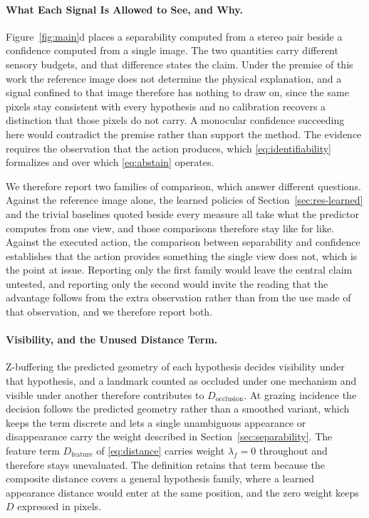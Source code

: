 \documentclass{article} %
\theoremstyle{defstyle}
\theoremstyle{plain}
\begin{document}
\paragraph{What Each Signal Is Allowed to See, and Why.}
Figure~\ref{fig:main}d places a separability computed from a stereo pair beside a confidence
computed from a single image. The two quantities carry different sensory budgets, and that
difference states the claim. Under the premise of this work the reference image does not
determine the physical explanation, and a signal confined to that image therefore has nothing
to draw on, since the same pixels stay consistent with every hypothesis and no calibration
recovers a distinction that those pixels do not carry. A monocular confidence succeeding here
would contradict the premise rather than support the method. The evidence requires the
observation that the action produces, which \eqref{eq:identifiability} formalizes and over
which \eqref{eq:abstain} operates.

We therefore report two families of comparison, which answer different questions. Against
the reference image alone, the learned policies of Section~\ref{sec:res-learned} and the
trivial baselines quoted beside every measure all take what the predictor computes from one
view, and those comparisons therefore stay like for like. Against the executed action, the
comparison between separability and confidence establishes that the action provides something
the single view does not, which is the point at issue. Reporting only the first family would
leave the central claim untested, and reporting only the second would invite the reading that
the advantage follows from the extra observation rather than from the use made of that
observation, and we therefore report both.

\paragraph{Visibility, and the Unused Distance Term.}
Z-buffering the predicted geometry of each hypothesis decides visibility under that
hypothesis, and a landmark counted as occluded under one mechanism and visible under another
therefore contributes to $D_{\text{occlusion}}$. At grazing incidence the decision follows
the predicted geometry rather than a smoothed variant, which keeps the term discrete and lets
a single unambiguous appearance or disappearance carry the weight described in
Section~\ref{sec:separability}. The feature term $D_{\text{feature}}$ of \eqref{eq:distance}
carries weight $\lambda_f = 0$ throughout and therefore stays unevaluated. The definition
retains that term because the composite distance covers a general hypothesis family, where a
learned appearance distance would enter at the same position, and the zero weight keeps $D$
expressed in pixels.
\end{document}
